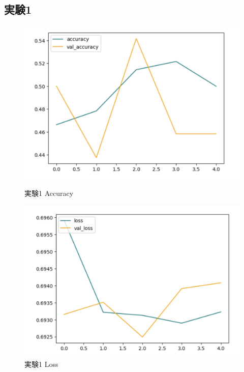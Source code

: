\documentclass[a4paper, 11pt, titlepage]{jsarticle}
\begin{document}
\subsection{実験1}
\begin{figure}[htbp]
  \begin{minipage}[b]{0.45\linewidth}
    \centering
    \includegraphics[keepaspectratio, scale=0.32]{ex1_acc.png}
    \caption{実験1 Accuracy}
  \end{minipage}
  \begin{minipage}[b]{0.45\linewidth}
    \centering
    \includegraphics[keepaspectratio, scale=0.32]{ex1_loss.png}
    \caption{実験1 Loss}
  \end{minipage}
\end{figure}
\end{document}
